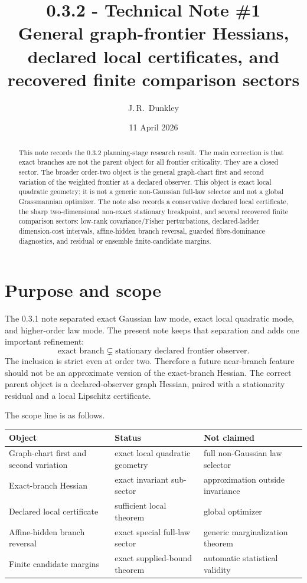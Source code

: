 \documentclass[11pt,a4paper]{article}
\title{\textbf{0.3.2 - Technical Note \#1}\\
\large{General graph-frontier Hessians, declared local certificates, and recovered finite comparison sectors}}
\author{J.\,R.~Dunkley}
\date{11 April 2026}
\numberwithin{equation}{section}
\theoremstyle{thmcompact}
\theoremstyle{remark}
\begin{document}
\maketitle

\begin{abstract}
This note records the 0.3.2 planning-stage research result. The main correction is that exact branches are not the parent object for all frontier criticality. They are a closed sector. The broader order-two object is the general graph-chart first and second variation of the weighted frontier at a declared observer. This object is exact local quadratic geometry; it is not a generic non-Gaussian full-law selector and not a global Grassmannian optimizer. The note also records a conservative declared local certificate, the sharp two-dimensional non-exact stationary breakpoint, and several recovered finite comparison sectors: low-rank covariance/Fisher perturbations, declared-ladder dimension-cost intervals, affine-hidden branch reversal, guarded fibre-dominance diagnostics, and residual or ensemble finite-candidate margins.
\end{abstract}

\section{Purpose and scope}

The 0.3.1 note separated exact Gaussian law mode, exact local quadratic mode, and higher-order law mode. The present note keeps that separation and adds one important refinement:
\[
\text{exact branch} \subsetneq \text{stationary declared frontier observer}.
\]
The inclusion is strict even at order two. Therefore a future near-branch feature should not be an approximate version of the exact-branch Hessian. The correct parent object is a declared-observer graph Hessian, paired with a stationarity residual and a local Lipschitz certificate.

The scope line is as follows.

\begin{center}
\small
\begin{tabular}{p{}p{}p{}}
\toprule
Object & Status & Not claimed \\
\midrule
Graph-chart first and second variation & exact local quadratic geometry & full non-Gaussian law selector \\
Exact-branch Hessian & exact invariant sub-sector & approximation outside invariance \\
Declared local certificate & sufficient local theorem & global optimizer \\
Affine-hidden branch reversal & exact special full-law sector & generic marginalization theorem \\
Finite candidate margins & exact supplied-bound theorem & automatic statistical validity \\
\bottomrule
\end{tabular}
\end{center}
\end{document}
